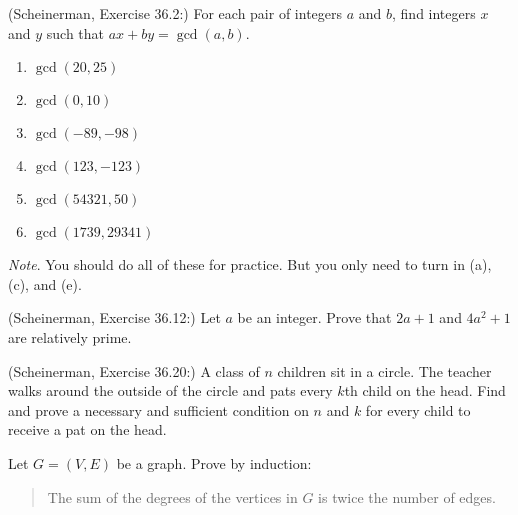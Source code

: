 \documentclass{article}
\theoremstyle{definition}
\newenvironment{note}{\noindent\emph{Note}.}{}
\begin{document}
\begin{question}
    (Scheinerman, Exercise 36.2:)
    For each pair of integers $a$ and $b$, find integers $x$ and $y$
    such that $ax+by = \gcd(a,b)$.
    \begin{enumerate}
        \item $\gcd(20,25)$
        \item $\gcd(0,10)$
        \item $\gcd(-89,-98)$
        \item $\gcd(123,-123)$
        \item $\gcd(54321,50)$
        \item $\gcd(1739,29341)$
    \end{enumerate}
\begin{note}
    You should do all of these for practice.
    But you only need to turn in (a), (c), and (e).
\end{note}
\end{question}
\begin{solution}
\end{solution}

\begin{question}
    (Scheinerman, Exercise 36.12:) 
    Let $a$ be an integer.  Prove that $2a+1$ and $4a^2+1$ are relatively prime.
\end{question}
\begin{solution}
\end{solution}


\begin{question}
    (Scheinerman, Exercise 36.20:)
    A class of $n$ children sit in a circle.
    The teacher walks around the outside of the circle and pats every
    $k$th child on the head.
    Find and prove a necessary and sufficient condition on $n$ and $k$
    for every child to receive a pat on the head.
\end{question}
\begin{solution}
\end{solution}

\begin{question}
     Let $G=(V,E)$ be a graph. Prove by induction: 
\begin{quote}
The sum of the degrees of the vertices in $G$ is twice the number of edges.
\end{quote}	
\end{question}
\begin{solution}
\end{solution}
\end{document}
